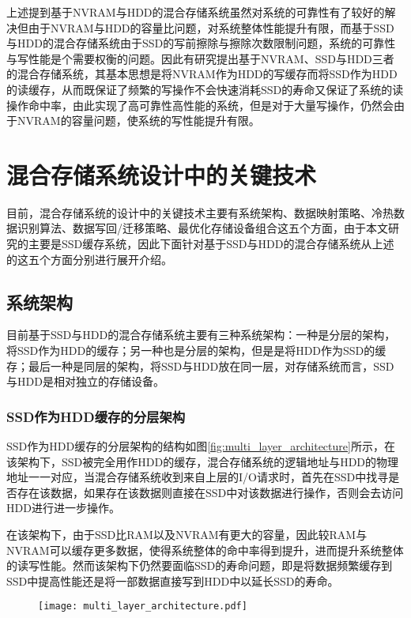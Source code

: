 上述提到基于NVRAM与HDD的混合存储系统虽然对系统的可靠性有了较好的解决但由于NVRAM与HDD的容量比问题，对系统整体性能提升有限，而基于SSD与HDD的混合存储系统由于SSD的写前擦除与擦除次数限制问题，系统的可靠性与写性能是个需要权衡的问题。因此有研究提出基于NVRAM、SSD与HDD三者的混合存储系统\cite{祝青2013混合存储系统研究}，其基本思想是将NVRAM作为HDD的写缓存而将SSD作为HDD的读缓存，从而既保证了频繁的写操作不会快速消耗SSD的寿命又保证了系统的读操作命中率，由此实现了高可靠性高性能的系统，但是对于大量写操作，仍然会由于NVRAM的容量问题，使系统的写性能提升有限。

\section{混合存储系统设计中的关键技术}

目前，混合存储系统的设计中的关键技术主要有系统架构、数据映射策略、冷热数据识别算法、数据写回/迁移策略、最优化存储设备组合这五个方面，由于本文研究的主要是SSD缓存系统，因此下面针对基于SSD与HDD的混合存储系统从上述的这五个方面分别进行展开介绍。

\subsection{系统架构}

目前基于SSD与HDD的混合存储系统主要有三种系统架构：一种是分层的架构，将SSD作为HDD的缓存；另一种也是分层的架构，但是是将HDD作为SSD的缓存；最后一种是同层的架构，将SSD与HDD放在同一层，对存储系统而言，SSD与HDD是相对独立的存储设备。

\subsubsection{SSD作为HDD缓存的分层架构}

SSD作为HDD缓存的分层架构的结构如图\ref{fig:multi_layer_architecture}所示，在该架构下，SSD被完全用作HDD的缓存，混合存储系统的逻辑地址与HDD的物理地址一一对应，当混合存储系统收到来自上层的I/O请求时，首先在SSD中找寻是否存在该数据，如果存在该数据则直接在SSD中对该数据进行操作，否则会去访问HDD进行进一步操作。

在该架构下，由于SSD比RAM以及NVRAM有更大的容量，因此较RAM与NVRAM可以缓存更多数据，使得系统整体的命中率得到提升，进而提升系统整体的读写性能。然而该架构下仍然要面临SSD的寿命问题，即是将数据频繁缓存到SSD中提高性能还是将一部数据直接写到HDD中以延长SSD的寿命。

\begin{figure}[!htp]
    \centering
    \texttt{[image: multi\_layer\_architecture.pdf]}
\end{figure}

